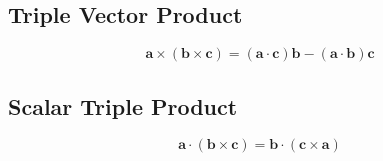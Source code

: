 \subsection{Triple Vector Product}

\begin{equation}
\mathbf{a} \times (\mathbf{b} \times \mathbf{c}) = (\mathbf{a} \cdot \mathbf{c})\mathbf{b} -(\mathbf{a} \cdot \mathbf{b} )\mathbf{c} \label{eq:vec1}
\end{equation}

\subsection{Scalar Triple Product}

\begin{equation}
\mathbf{a}\cdot(\mathbf{b}\times\mathbf{c}) = \mathbf{b}\cdot(\mathbf{c}\times\mathbf{a}) \label{eq:vec2}
\end{equation}